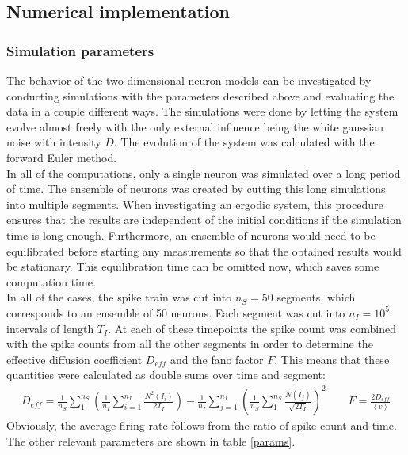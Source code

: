 \documentclass[12pt,a4paper]{article}
\begin{document}
\subsection{Numerical implementation}\label{numerics}
\subsubsection{Simulation parameters}
The behavior of the two-dimensional neuron models can be investigated by conducting simulations with the parameters described above and evaluating the data in a couple different ways. The simulations were done by letting the system evolve almost freely with the only external influence being the white gaussian noise with intensity $D$. The evolution of the system was calculated with the forward Euler method.\\
In all of the computations, only a single neuron was simulated over a long period of time. The ensemble of neurons was created by cutting this long simulations into multiple segments. When investigating an ergodic system, this procedure ensures that the results are independent of the initial conditions if the simulation time is long enough. Furthermore, an ensemble of neurons would need to be equilibrated before starting any measurements so that the obtained results would be stationary. This equilibration time can be omitted now, which saves some computation time. \\
In all of the cases, the spike train was cut into $n_S=50$ segments, which corresponds to an ensemble of 50 neurons. Each segment was cut into $n_I=10^5$ intervals of length $T_I$. At each of these timepoints the spike count was combined with the spike counts from all the other segments in order to determine the effective diffusion coefficient $D_{eff}$ and the fano factor $F$. This means that these quantities were calculated as double sums over time and segment:
\begin{align*}
D_{eff}=\frac{1}{n_S}\sum_{1}^{n_S}\left(\frac{1}{n_I}\sum_{i=1}^{n_I}\frac{N^2(I_i)}{2T_I}\right)-\frac{1}{n_I}\sum_{j=1}^{n_I}\left(\frac{1}{n_S}\sum_{1}^{n_S}\frac{N(I_j)}{\sqrt{2T_I}}\right)^2\qquad F=\frac{2D_{eff}}{\left<v\right>}
\end{align*}
Obviously, the average firing rate follows from the ratio of spike count and time.\\
The other relevant parameters are shown in table \ref{params}.
\end{document}
